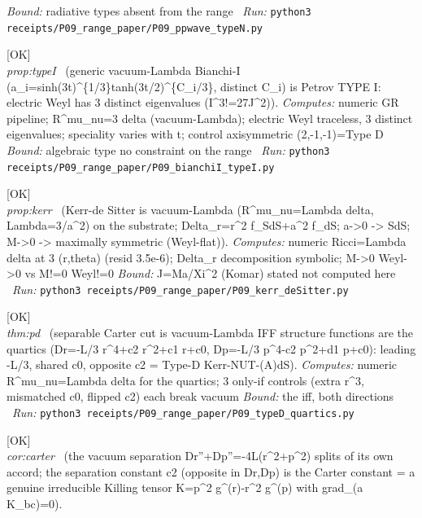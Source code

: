 \begin{description}
 \emph{Bound:} radiative types absent from the range
\ \emph{Run:} \texttt{python3 receipts/P09\_range\_paper/P09\_ppwave\_typeN.py}
\item[\label{rcpt:P09_bianchiI_typeI}\texttt{P09\_bianchiI\_typeI}]\hfill\textsf{[OK]}\\
\textit{prop:typeI} \ (generic vacuum-Lambda Bianchi-I (a\_i=sinh(3t)\textasciicircum{}\{1/3\}tanh(3t/2)\textasciicircum{}\{C\_i/3\}, distinct C\_i) is Petrov TYPE I: electric Weyl has 3 distinct eigenvalues (I\textasciicircum{}3!=27J\textasciicircum{}2)). 
\emph{Computes:} numeric GR pipeline; R\textasciicircum{}mu\_nu=3 delta (vacuum-Lambda); electric Weyl traceless, 3 distinct eigenvalues; speciality varies with t; control axisymmetric (2,-1,-1)=Type D
 \emph{Bound:} algebraic type no constraint on the range
\ \emph{Run:} \texttt{python3 receipts/P09\_range\_paper/P09\_bianchiI\_typeI.py}
\item[\label{rcpt:P09_kerr_deSitter}\texttt{P09\_kerr\_deSitter}]\hfill\textsf{[OK]}\\
\textit{prop:kerr} \ (Kerr-de Sitter is vacuum-Lambda (R\textasciicircum{}mu\_nu=Lambda delta, Lambda=3/a\textasciicircum{}2) on the substrate; Delta\_r=r\textasciicircum{}2 f\_SdS+a\textasciicircum{}2 f\_dS; a->0 -> SdS; M->0 -> maximally symmetric (Weyl-flat)). 
\emph{Computes:} numeric Ricci=Lambda delta at 3 (r,theta) (resid 3.5e-6); Delta\_r decomposition symbolic; M->0 Weyl->0 vs M!=0 Weyl!=0
 \emph{Bound:} J=Ma/Xi\textasciicircum{}2 (Komar) stated not computed here
\ \emph{Run:} \texttt{python3 receipts/P09\_range\_paper/P09\_kerr\_deSitter.py}
\item[\label{rcpt:P09_typeD_quartics}\texttt{P09\_typeD\_quartics}]\hfill\textsf{[OK]}\\
\textit{thm:pd} \ (separable Carter cut is vacuum-Lambda IFF structure functions are the quartics (Dr=-L/3 r\textasciicircum{}4+c2 r\textasciicircum{}2+c1 r+c0, Dp=-L/3 p\textasciicircum{}4-c2 p\textasciicircum{}2+d1 p+c0): leading -L/3, shared c0, opposite c2 = Type-D Kerr-NUT-(A)dS). 
\emph{Computes:} numeric R\textasciicircum{}mu\_nu=Lambda delta for the quartics; 3 only-if controls (extra r\textasciicircum{}3, mismatched c0, flipped c2) each break vacuum
 \emph{Bound:} the iff, both directions
\ \emph{Run:} \texttt{python3 receipts/P09\_range\_paper/P09\_typeD\_quartics.py}
\item[\label{rcpt:P09_carter_killing}\texttt{P09\_carter\_killing}]\hfill\textsf{[OK]}\\
\textit{cor:carter} \ (the vacuum separation Dr''+Dp''=-4L(r\textasciicircum{}2+p\textasciicircum{}2) splits of its own accord; the separation constant c2 (opposite in Dr,Dp) is the Carter constant = a genuine irreducible Killing tensor K=p\textasciicircum{}2 g\textasciicircum{}(r)-r\textasciicircum{}2 g\textasciicircum{}(p) with grad\_(a K\_bc)=0). 

\end{description}

